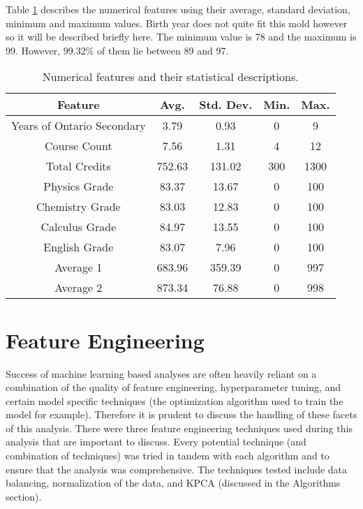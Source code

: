 Table \ref{tab:numericalFeatures} describes the numerical features using their average, standard deviation, minimum and maximum values. Birth year does not quite fit this mold however so it will be described briefly here. The minimum value is 78 and the maximum is 99. However, 99.32\% of them lie between 89 and 97.

\begin{table}[!ht]
\begin{center}
\begin{tabular}{c|c|c|c|c}
	\textbf{Feature}			&\textbf{Avg.}	&\textbf{Std. Dev.}	&\textbf{Min.}	&\textbf{Max.}\\\hline
	Years of Ontario Secondary	&3.79			&0.93				&0				&9\\
	Course Count				&7.56			&1.31				&4				&12\\
	Total Credits				&752.63			&131.02				&300			&1300\\
	Physics Grade				&83.37			&13.67				&0				&100\\
	Chemistry Grade				&83.03			&12.83				&0				&100\\
	Calculus Grade				&84.97			&13.55				&0				&100\\
	English Grade				&83.07			&7.96				&0				&100\\
	Average 1					&683.96			&359.39				&0				&997\\
	Average 2					&873.34			&76.88				&0				&998
\end{tabular}
\end{center}
\caption{Numerical features and their statistical descriptions.}
\label{tab:numericalFeatures}
\end{table}

\section{Feature Engineering}
Success of machine learning based analyses are often heavily reliant on a combination of the quality of feature engineering, hyperparameter tuning, and certain model specific techniques (the optimization algorithm used to train the model for example). Therefore it is prudent to discuss the handling of these facets of this analysis. There were three feature engineering techniques used during this analysis that are important to discuss. Every potential technique (and combination of techniques) was tried in tandem with each algorithm and to ensure that the analysis was comprehensive. The techniques tested include data balancing, normalization of the data, and KPCA (discussed in the Algorithms section).


